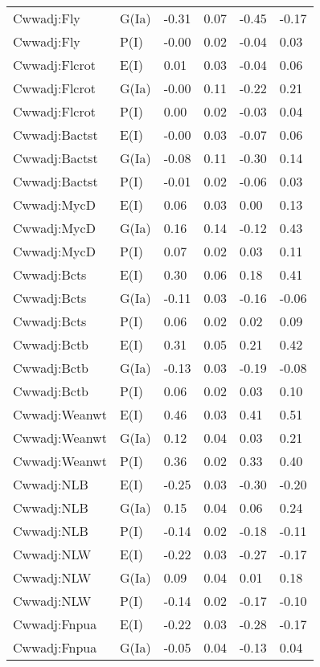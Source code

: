 \begin{center}
\begin{longtable}{|p{1.1in}|p{0.7in}|p{0.7in}|p{0.6in}|p{0.6in}|p{0.6in}|}
  Cwwadj:Fly & G(Ia) & -0.31 & 0.07 & -0.45 & -0.17 \\ 
  Cwwadj:Fly & P(I) & -0.00 & 0.02 & -0.04 & 0.03 \\ 
  Cwwadj:Flcrot & E(I) & 0.01 & 0.03 & -0.04 & 0.06 \\ 
  Cwwadj:Flcrot & G(Ia) & -0.00 & 0.11 & -0.22 & 0.21 \\ 
  Cwwadj:Flcrot & P(I) & 0.00 & 0.02 & -0.03 & 0.04 \\ 
  Cwwadj:Bactst & E(I) & -0.00 & 0.03 & -0.07 & 0.06 \\ 
  Cwwadj:Bactst & G(Ia) & -0.08 & 0.11 & -0.30 & 0.14 \\ 
  Cwwadj:Bactst & P(I) & -0.01 & 0.02 & -0.06 & 0.03 \\ 
  Cwwadj:MycD & E(I) & 0.06 & 0.03 & 0.00 & 0.13 \\ 
  Cwwadj:MycD & G(Ia) & 0.16 & 0.14 & -0.12 & 0.43 \\ 
  Cwwadj:MycD & P(I) & 0.07 & 0.02 & 0.03 & 0.11 \\ 
  Cwwadj:Bcts & E(I) & 0.30 & 0.06 & 0.18 & 0.41 \\ 
  Cwwadj:Bcts & G(Ia) & -0.11 & 0.03 & -0.16 & -0.06 \\ 
  Cwwadj:Bcts & P(I) & 0.06 & 0.02 & 0.02 & 0.09 \\ 
  Cwwadj:Bctb & E(I) & 0.31 & 0.05 & 0.21 & 0.42 \\ 
  Cwwadj:Bctb & G(Ia) & -0.13 & 0.03 & -0.19 & -0.08 \\ 
  Cwwadj:Bctb & P(I) & 0.06 & 0.02 & 0.03 & 0.10 \\ 
  Cwwadj:Weanwt & E(I) & 0.46 & 0.03 & 0.41 & 0.51 \\ 
  Cwwadj:Weanwt & G(Ia) & 0.12 & 0.04 & 0.03 & 0.21 \\ 
  Cwwadj:Weanwt & P(I) & 0.36 & 0.02 & 0.33 & 0.40 \\ 
  Cwwadj:NLB & E(I) & -0.25 & 0.03 & -0.30 & -0.20 \\ 
  Cwwadj:NLB & G(Ia) & 0.15 & 0.04 & 0.06 & 0.24 \\ 
  Cwwadj:NLB & P(I) & -0.14 & 0.02 & -0.18 & -0.11 \\ 
  Cwwadj:NLW & E(I) & -0.22 & 0.03 & -0.27 & -0.17 \\ 
  Cwwadj:NLW & G(Ia) & 0.09 & 0.04 & 0.01 & 0.18 \\ 
  Cwwadj:NLW & P(I) & -0.14 & 0.02 & -0.17 & -0.10 \\ 
  Cwwadj:Fnpua & E(I) & -0.22 & 0.03 & -0.28 & -0.17 \\ 
  Cwwadj:Fnpua & G(Ia) & -0.05 & 0.04 & -0.13 & 0.04 \\ 

\end{longtable}
\end{center}
